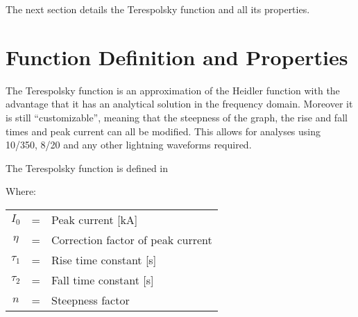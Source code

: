 The next section details the Terespolsky function and all its properties.


\section{Function Definition and Properties}
\label{sec:function_definition_and_properties}

The Terespolsky function is an approximation of the Heidler function with the advantage that it has an analytical solution in the frequency domain. Moreover it is still ``customizable'', meaning that the steepness of the graph, the rise and fall times and peak current can all be modified. This allows for analyses using 10/350, 8/20 and any other lightning waveforms required.

The Terespolsky function is defined in 

Where: \\
\begin{tabular}{cll}
    $I_0$ & = & Peak current [kA] \\
    $\eta$ & = & Correction factor of peak current \\
    $\tau_1$ & = & Rise time constant [s] \\
    $\tau_2$ & = & Fall time constant [s] \\
    $n$ & = & Steepness factor
\end{tabular}\\

